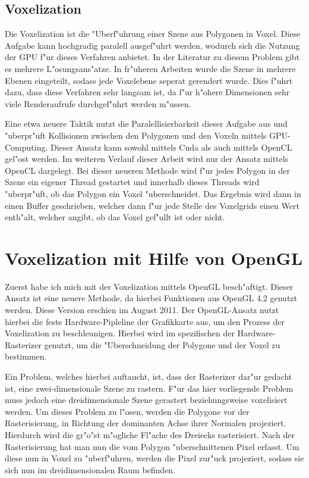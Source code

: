 \documentclass[a4paper, 12pt]{scrartcl}
\begin{document}
\subsection{Voxelization}
Die Voxelization ist die "Uberf"uhrung einer Szene aus Polygonen in Voxel. Diese Aufgabe kann hochgradig paralell ausgef"uhrt werden, wodurch sich die Nutzung der GPU f"ur dieses Verfahren anbietet. In der Literatur zu diesem Problem gibt es mehrere L"osungsans"atze. In fr"uheren Arbeiten wurde die Szene in mehrere Ebenen eingeteilt, sodass jede Voxelebene seperat gerendert wurde. Dies f"uhrt dazu, dass diese Verfahren sehr langsam ist, da f"ur h"ohere Dimensionen sehr viele Renderaufrufe durchgef"uhrt werden m"ussen.

Eine etwa neuere Taktik nutzt die Paralellisierbarkeit dieser Aufgabe aus und "uberpr"uft Kollisionen zwischen den Polygonen und den Voxeln mittels GPU-Computing. Dieser Ansatz kann sowohl mittels Cuda als auch mittels OpenCL gel"ost werden. Im weiteren Verlauf dieser Arbeit wird nur der Ansatz mittels OpenCL dargelegt.
Bei dieser neueren Methode wird f"ur jedes Polygon in der Szene ein eigener Thread gestartet und innerhalb dieses Threads wird "uberpr"uft, ob das Polygon ein Voxel "uberschneidet. Das Ergebnis wird dann in einen Buffer geschrieben, welcher dann f"ur jede Stelle des Voxelgrids einen Wert enth"alt, welcher angibt, ob das Voxel gef"ullt ist oder nicht.

\section{Voxelization mit Hilfe von OpenGL}
Zuerst habe ich mich mit der Voxelization mittels OpenGL besch"aftigt. Dieser Ansatz ist eine neuere Methode, da hierbei Funktionen aus OpenGL 4.2 genutzt werden. Diese Version erschien im August 2011. 
Der OpenGL-Ansatz nutzt hierbei die feste Hardware-Pipleline der Grafikkarte aus, um den Prozess der Voxelization zu beschleunigen. Hierbei wird im spezifischen der Hardware-Rasterizer genutzt, um die "Uberschneidung der Polygone und der Voxel zu bestimmen. 

Ein Problem, welches hierbei auftaucht, ist, dass der Rasterizer dar"ur gedacht ist, eine zwei-dimensionale Szene zu rastern. F"ur das hier vorliegende Problem muss jedoch eine dreidimensionale Szene gerastert beziehungsweise voxelisiert werden.
Um dieses Problem zu l"osen, werden die Polygone vor der Rasterisierung, in Richtung der dominanten Achse ihrer Normalen projeziert. Hierdurch wird die gr"o"st m"ogliche Fl"ache des Dreiecks rasterisiert. Nach der Rasterisierung hat man nun die vom Polygon "uberschnittenen Pixel erfasst. Um diese nun in Voxel zu "uberf"uhren, werden die Pixel zur"uck projeziert, sodass sie sich nun im dreidimensionalen Raum befinden.
\end{document}
